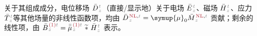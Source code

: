 关于其组成成分，电位移场 $\bar{D}^{\;\!\textcolor{gray}{t}}_{\;\!\textcolor{gray}{z}}$（直接/显示地）关于电场 $\bar{E}^{\;\!\textcolor{gray}{t}}_{\;\!\textcolor{gray}{z}}$、磁场 $\bar{H}^{\;\!\textcolor{gray}{t}}_{\;\!\textcolor{gray}{z}}$、应力 $\bar{T}^{\;\!\textcolor{gray}{t}}_{\;\!\textcolor{gray}{z}}$等其他场量的非线性函数项，均由 $\bar{D}^{\;\!\textcolor{Maroon}{\text{NL}}, \textcolor{gray}{t}}_{\;\!\textcolor{gray}{z}} = {\symup{\mu}}_0 \bar{M}^{\;\!\textcolor{Maroon}{\text{NL}}, \textcolor{gray}{t}}_{\;\!\textcolor{gray}{z}}$ 贡献；剩余的线性项，由 $\bar{B}^{\;\!\textcolor{Maroon}{\text{(1)}} \textcolor{gray}{t}}_{\;\!\textcolor{gray}{z}} = \bar{\bar{\mu}}^{\;\!\textcolor{Maroon}{\text{(1)}} \textcolor{gray}{t}}_{\;\!\textcolor{gray}{z}}~\widetilde *~\bar{H}^{\;\!\textcolor{gray}{t}}_{\;\!\textcolor{gray}{z}}$ 表示。


